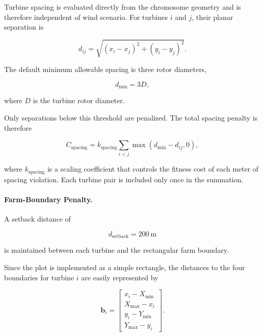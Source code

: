 \documentclass[11pt]{article}
\begin{document}
Turbine spacing is evaluated directly from the chromosome geometry and is therefore independent of wind scenario. For turbines $i$ and $j$, their planar separation is

\begin{equation}
    d_{ij}
    =
    \sqrt{
        (x_i-x_j)^2
        +
        (y_i-y_j)^2
    }.
\end{equation}

The default minimum allowable spacing is three rotor diameters,

\begin{equation}
    d_{\min} = 3D,
\end{equation}

where $D$ is the turbine rotor diameter.

Only separations below this threshold are penalized. The total spacing penalty is therefore

\begin{equation}
    C_{\mathrm{spacing}}
    =
    k_{\mathrm{spacing}}
    \sum_{i<j}
    \max
    \left(
        d_{\min}-d_{ij},
        0
    \right),
    \label{eq:spacing-penalty}
\end{equation}

where $k_{\mathrm{spacing}}$ is a scaling coefficient that controls the fitness cost of each meter of spacing violation. Each turbine pair is included only once in the summation.


\paragraph{Farm-Boundary Penalty.}

A setback distance of

\begin{equation}
    d_{\mathrm{setback}} = 200~\mathrm{m}
\end{equation}

is maintained between each turbine and the rectangular farm boundary.

Since the plot is implemented as a simple rectangle, the distances to the four boundaries for turbine $i$ are easily represented by

\begin{equation}
    \mathbf{b}_i
    =
    \begin{bmatrix}
        x_i-X_{\min} \\
        X_{\max}-x_i \\
        y_i-Y_{\min} \\
        Y_{\max}-y_i
    \end{bmatrix}.
\end{equation}
\end{document}
